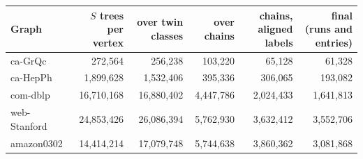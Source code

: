 \begin{tabular}{@{}lrrrrr@{}}
\toprule
Graph & $S$ trees per vertex & over twin classes & over chains & chains, aligned labels & final (runs and entries) \\
\midrule
ca-GrQc & 272,564 & 256,238 & 103,220 & 65,128 & 61,328 \\
ca-HepPh & 1,899,628 & 1,532,406 & 395,336 & 306,065 & 193,082 \\
com-dblp & 16,710,168 & 16,880,402 & 4,447,786 & 2,024,433 & 1,641,813 \\
web-Stanford & 24,853,426 & 26,086,394 & 5,762,930 & 3,632,412 & 3,552,706 \\
amazon0302 & 14,414,214 & 17,079,748 & 5,744,638 & 3,860,362 & 3,081,868 \\
\bottomrule
\end{tabular}
